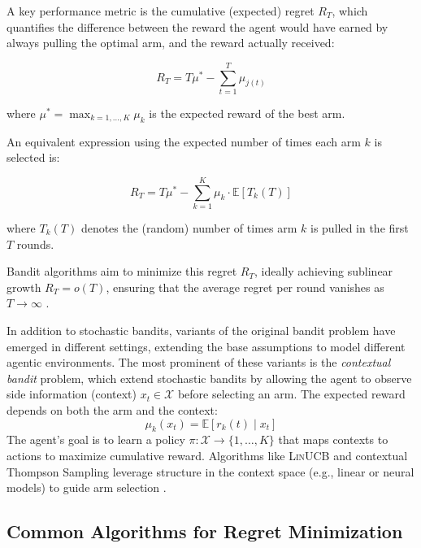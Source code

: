 \documentclass[11pt]{article}
\begin{document}
A key performance metric is the cumulative (expected) regret $R_T$, which quantifies the difference between the reward the agent would have earned by always pulling the optimal arm, and the reward actually received:

$$
R_T = T\mu^* - \sum_{t=1}^T \mu_{j(t)}
$$

where $\mu^* = \max_{k=1,\dots,K} \mu_k$ is the expected reward of the best arm.

An equivalent expression using the expected number of times each arm $k$ is selected is:

$$
R_T = T\mu^* - \sum_{k=1}^K \mu_k \cdot \mathbb{E}[T_k(T)]
$$

where $T_k(T)$ denotes the (random) number of times arm $k$ is pulled in the first $T$ rounds.

Bandit algorithms aim to minimize this regret $R_T$, ideally achieving sublinear growth $R_T = o(T)$, ensuring that the average regret per round vanishes as $T \to \infty$ \cite{KuleshovPrecup2000}.

In addition to stochastic bandits, variants of the original bandit problem have emerged in different settings, extending the base assumptions to model different agentic environments. The most prominent of these variants is the \textit{contextual bandit} problem, which extend stochastic bandits by allowing the agent to observe side information (context) $x_t \in \mathcal{X}$ before selecting an arm. The expected reward depends on both the arm and the context:
    $$
    \mu_k(x_t) = \mathbb{E}[r_k(t) \mid x_t]
    $$
    The agent’s goal is to learn a policy $\pi: \mathcal{X} \rightarrow \{1, \dots, K\}$ that maps contexts to actions to maximize cumulative reward. Algorithms like \textsc{LinUCB} and contextual Thompson Sampling leverage structure in the context space (e.g., linear or neural models) to guide arm selection \cite{Lu2010}.

\subsection*{Common Algorithms for Regret Minimization}
\end{document}
